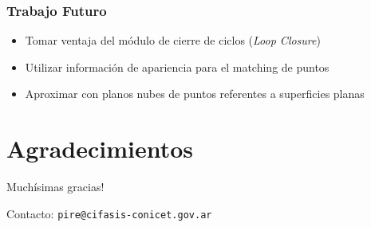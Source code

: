 \documentclass[compress]{beamer}
\begin{document}
\begin{frame}
	\frametitle{Trabajo Futuro}
	\begin{itemize}
		\item Tomar ventaja del módulo de cierre de ciclos (\emph{Loop Closure})
		\item Utilizar información de apariencia para el matching de puntos
		\item Aproximar con planos nubes de puntos referentes a superficies planas
	\end{itemize}
\end{frame}


\section*{Agradecimientos}

\begin{frame}
	\centering
	\Large{Muchísimas gracias!}
	
	
	\vspace{2cm}
	Contacto: {\tt pire@cifasis-conicet.gov.ar}
\end{frame}
\end{document}
